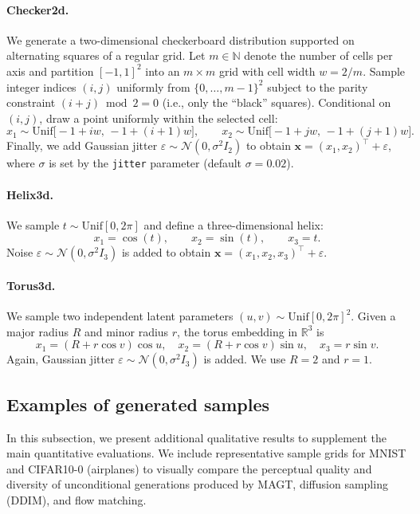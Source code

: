 \documentclass[12pt]{article}
\theoremstyle{definition} %
\newcommand{\Unif}{\mathrm{Unif}}
\providecommand{\method}{MAGT} %
\begin{document}
\paragraph{Checker2d.}
We generate a two-dimensional checkerboard distribution supported on alternating squares of a regular grid.
Let $m\in\mathbb{N}$ denote the number of cells per axis and partition $[-1,1]^2$ into an $m\times m$ grid with
cell width $w = 2/m$. Sample integer indices $(i,j)$ uniformly from $\{0,\ldots,m-1\}^2$ subject to the parity
constraint $(i+j)\bmod 2 = 0$ (i.e., only the ``black'' squares). Conditional on $(i,j)$, draw a point uniformly
within the selected cell:
\[
x_1 \sim \Unif\!\bigl[-1 + iw,\,-1 + (i+1)w\bigr],\qquad
x_2 \sim \Unif\!\bigl[-1 + jw,\,-1 + (j+1)w\bigr].
\]
Finally, we add Gaussian jitter $\varepsilon \sim \mathcal{N}(0,\sigma^2 I_2)$ to obtain
$\mathbf{x}=(x_1,x_2)^\top+\varepsilon$, where $\sigma$ is set by the \texttt{jitter} parameter (default $\sigma=0.02$).



 \paragraph{Helix3d.} 
 We sample $t \sim \Unif[0,2\pi]$ and define a three-dimensional helix:
 \[
 x_1 = \cos(t), \qquad x_2 = \sin(t), \qquad x_3 = t.
 \]
 Noise $\varepsilon \sim \mathcal{N}(0, \sigma^2 I_3)$ is added to obtain $\mathbf{x} = (x_1, x_2, x_3)^\top + \varepsilon$.

 \paragraph{Torus3d.} 
 We sample two independent latent parameters $(u,v) \sim \Unif[0,2\pi]^2$. Given a major radius $R$ and minor radius $r$, the torus embedding in $\mathbb{R}^3$ is
 \[
 x_1 = (R + r\cos v)\cos u, \quad 
 x_2 = (R + r\cos v)\sin u, \quad 
 x_3 = r\sin v.
 \]
 Again, Gaussian jitter $\varepsilon \sim \mathcal{N}(0, \sigma^2 I_3)$ is added. We use $R=2$ and $r=1$.

\subsection{Examples of generated samples}
In this subsection, we present additional qualitative results to supplement the main quantitative evaluations. We include representative sample grids for MNIST and CIFAR10-0 (airplanes) to visually compare the perceptual quality and diversity of unconditional generations produced by \method{}, diffusion sampling (DDIM), and flow matching.
\end{document}
